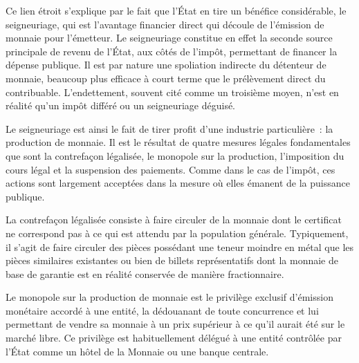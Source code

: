 Ce lien étroit s'explique par le fait que l'État en tire un bénéfice considérable, le seigneuriage, qui est l'avantage financier direct qui découle de l'émission de monnaie pour l'émetteur. Le seigneuriage constitue en effet la seconde source principale de revenu de l'État, aux côtés de l'impôt, permettant de financer la dépense publique. Il est par nature une spoliation indirecte du détenteur de monnaie, beaucoup plus efficace à court terme que le prélèvement direct du contribuable. L'endettement, souvent cité comme un troisième moyen, n'est en réalité qu'un impôt différé ou un seigneuriage déguisé.


Le seigneuriage est ainsi le fait de tirer profit d'une industrie particulière~: la production de monnaie. Il est le résultat de quatre mesures légales fondamentales que sont la contrefaçon légalisée, le monopole sur la production, l'imposition du cours légal et la suspension des paiements. Comme dans le cas de l'impôt, ces actions sont largement acceptées dans la mesure où elles émanent de la puissance publique.

La contrefaçon légalisée consiste à faire circuler de la monnaie dont le certificat ne correspond pas à ce qui est attendu par la population générale. Typiquement, il s'agit de faire circuler des pièces possédant une teneur moindre en métal que les pièces similaires existantes ou bien de billets représentatifs dont la monnaie de base de garantie est en réalité conservée de manière fractionnaire.

Le monopole sur la production de monnaie est le privilège exclusif d'émission monétaire accordé à une entité, la dédouanant de toute concurrence et lui permettant de vendre sa monnaie à un prix supérieur à ce qu'il aurait été sur le marché libre. Ce privilège est habituellement délégué à une entité contrôlée par l'État comme un hôtel de la Monnaie ou une banque centrale. %


